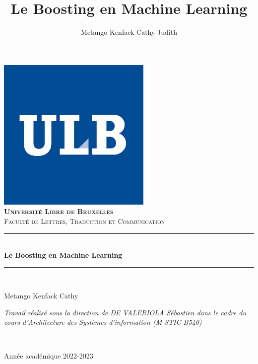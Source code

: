\documentclass[french,a4paper,12pt]{article}
\title{Le Boosting en Machine Learning} %
\author{Metango Kenfack Cathy Judith}
\newcommand{\HRule}{\rule{\linewidth}{0.5mm}}
\begin{document}
\begin{titlepage}
  \begin{sffamily}
  \begin{center}
     \includegraphics[scale=0.25]{logoulb.JPG}~\\[1.5cm]

    \textsc{\bfseries \LARGE Université Libre de Bruxelles }\\[0.5cm]
    \textsc{\Large Faculté de Lettres, Traduction et Communication}\\[6cm]

    \HRule \\[0.4cm]
    { \huge \bfseries Le Boosting en Machine Learning\\[0.4cm] }

    \HRule \\[4cm]
    \begin{minipage}{0.4\textwidth}
      \begin{flushleft} \large
        Metango Kenfack Cathy \\

        
      \end{flushleft}
    \end{minipage}
    \begin{minipage}{0.4\textwidth}
      \begin{flushright} \large
        \emph{Travail réalisé sous la direction de DE VALERIOLA Sébastien dans le cadre du cours d'Architecture des Systèmes d'information (M-STIC-B540)} 
      \end{flushright}
    \end{minipage} \\ [2cm]

    \vfill

    {\large {} Année académique 2022-2023}

  \end{center}
  \end{sffamily}
\end{titlepage}
\end{document}
